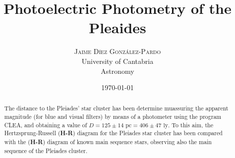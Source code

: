 \documentclass[twoside]{article}
\title{
	\vspace{-15mm}
	\fontsize{28pt}{10pt}
	\selectfont\textbf{Photoelectric Photometry of the Pleaides}%
}
\author{
	\large
	\textsc{Jaime Díez González-Pardo}\\[4mm]%
	\fontsize{28pt}{10pt} University of Cantabria \\ %
	\normalsize Astronomy \\ 
}
\date{ \usdate\today }
\begin{document}
	\maketitle %


	\thispagestyle{fancy} %


	\begin{abstract}

		\noindent%

		The distance to the Pleiades' star cluster has been determine muassuring the apparent magnitude (for blue and visual filters) by means of a photometer using the program CLEA, and obtaining a value of $D = 125 \pm 14 \textrm{ pc} = 406 \pm 47 \textrm{ ly}$. To this aim, the Hertzsprung-Russell (\textbf{H-R}) diagram for the Pleiades star cluster has been compared with the (\textbf{H-R}) diagram of known main sequence stars, observing also the main sequence of the Pleiades cluster.

	\end{abstract}

\end{document}
